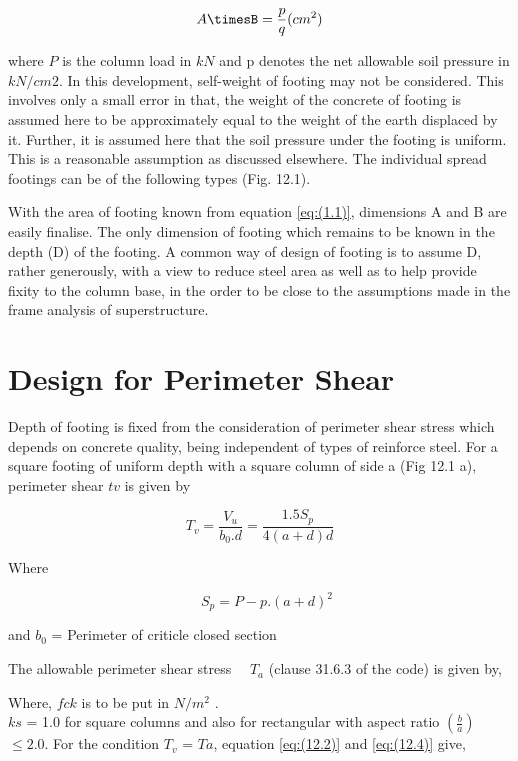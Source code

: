 \documentclass{book}
\begin{document}
\begin{equation}
\label{eq:(1.1)}
A\timesB =\frac{p}{q} (cm^2)
\end{equation}

where $P$ is the column load in $kN$ and p denotes the net allowable soil pressure in $kN/cm2$. In this development, self-weight of footing may not be considered. This involves only a small error in that, the weight of the concrete of footing is assumed here to be approximately equal to the weight of the earth displaced by it. Further, it is assumed here that the soil pressure under the footing is uniform. This is a reasonable assumption as discussed elsewhere. The individual spread footings can be of the following types (Fig. 12.1).

With the area of footing known from equation \ref{eq:(1.1)}, dimensions A and B are easily finalise. The only dimension of footing which remains to be known in the depth (D) of the footing. A common way of design of footing is to assume D, rather generously, with a view to reduce steel area as well as to help provide fixity to the column base, in the order to be close to the assumptions made in the frame analysis of superstructure.

\section{Design for Perimeter Shear}
Depth of footing is fixed from the consideration of perimeter shear stress which depends on concrete quality, being independent of types of reinforce steel. For a square footing of uniform depth with a square column of side a (Fig 12.1 a), perimeter shear $tv$ is given by

\begin{equation}
\label{eq:(1.2)}
T_v = \frac{V_u} {{b_0}.d} 
=\frac{1.5 S_p} {4(a+d)d} 
\end{equation}

Where 

\begin{equation}
\label{eq:(1.3)}
\quad S_p = P-p . (a+d)^2
\end{equation}

and $b_0$ = Perimeter of criticle closed section
\par The allowable perimeter shear stress
$\quad{T_a}$  
(clause 31.6.3 of the code) is given by,

Where, $fck$ is to be put in $N/m^2$ .\\
 $ks$ = 1.0 for square columns and also for rectangular with aspect ratio  $\left( \frac{b}{a} \right)$ $\leq {2.0}$. For the condition $T_v$ = $Ta$, equation \ref{eq:(12.2)} and \ref{eq:(12.4)} give,
\end{document}

